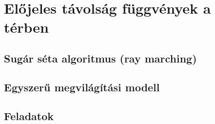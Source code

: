 \section{Előjeles távolság függvények a térben}

\subsection{Sugár séta algoritmus (ray marching)}

\subsection{Egyszerű megvilágítási modell}

\subsection{Feladatok}



